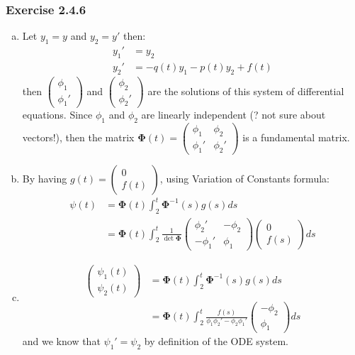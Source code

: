 \documentclass[12pt, letterpaper]{scrartcl}
\begin{document}
\subsubsection*{Exercise 2.4.6}
\begin{enumerate}[(a)]
    \item Let $y_1=y$ and $y_2=y'$ then:
    \begin{align*}
        y_1'&=y_2\\
        y_2'&=-q(t)y_1-p(t)y_2+f(t)
    \end{align*}
    then $\left( \begin{array}{c} \phi_1 \\ \phi_1'\end{array}\right)$ and $\left( \begin{array}{c} \phi_2 \\ \phi_2'\end{array}\right)$ are the solutions of this system of differential equations. Since $\phi_1$ and $\phi_2$ are linearly independent (? not sure about vectors!), then the matrix $\bm\Phi(t)=\left( \begin{array}{cc} \phi_1 & \phi_2 \\ \phi_1' & \phi_2'\end{array}\right)$ is a fundamental matrix.

    \item 
    By having $g(t)=\left( \begin{array}{c} 0 \\ f(t)\end{array}\right)$, using Variation of Constants formula:
    \begin{align*}
        \psi(t)&=\bm\Phi(t)\int_2^t \bm\Phi^{-1}(s)g(s)ds\\
        &=\bm\Phi(t)\int_2^t \frac{1}{\det\bm\Phi}\left( \begin{array}{cc} \phi_2' & -\phi_2 \\ -\phi_1' & \phi_1 \end{array}\right)\left( \begin{array}{c} 0 \\ f(s)\end{array}\right)ds
    \end{align*}
    
    \item
    \begin{align*}
        \left( \begin{array}{c} \psi_1(t) \\ \psi_2(t)\end{array}\right)&=\bm\Phi(t)\int_2^t \bm\Phi^{-1}(s)g(s)ds\\
        &=\bm\Phi(t)\int_2^t \frac{f(s)}{\phi_1\phi_2'-\phi_2\phi_1'}\left( \begin{array}{c} -\phi_2 \\ \phi_1\end{array}\right)ds
    \end{align*}
    and we know that $\psi_1'=\psi_2$ by definition of the ODE system.
\end{enumerate}
\end{document}
